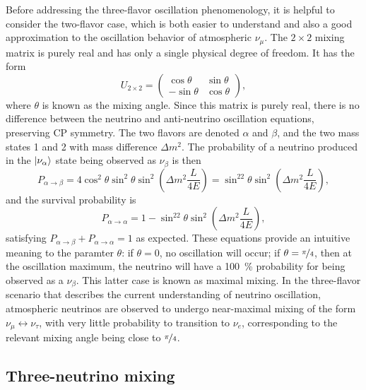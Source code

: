 Before addressing the three-flavor oscillation phenomenology,
it is helpful to consider the two-flavor case,
which is both easier to understand
and also a good approximation to the oscillation behavior
of atmospheric $\nu_\mu$.
The $2\times2$ mixing matrix is purely real
and has only a single physical degree of freedom.
It has the form
\begin{equation}\label{eq:2d_mixing}
    U_{2\times2} =
    \begin{pmatrix}
        \cos\theta & \sin\theta \\
        -\sin\theta & \cos\theta
    \end{pmatrix},
\end{equation}
where $\theta$ is known as the mixing angle.
Since this matrix is purely real,
there is no difference between the neutrino and anti-neutrino
oscillation equations, preserving CP symmetry.
The two flavors are denoted $\alpha$ and $\beta$,
and the two mass states 1 and 2 with mass difference $\Delta m^2$.
The probability of a neutrino produced in the $\ket{\nu_\alpha}$ state
being observed as $\nu_\beta$ is then
\begin{equation}\label{eq:2d_osc}
    P_{\alpha\to\beta} = 4\cos^2\theta\sin^2\theta
    \sin^2\left(\Delta m^2\frac{L}{4E}\right)
    = \sin^22\theta \sin^2\left(\Delta m^2\frac{L}{4E}\right),
\end{equation}
and the survival probability is
\begin{equation}\label{eq:2d_p_sur}
    P_{\alpha\to\alpha} = 1 -
    \sin^22\theta \sin^2\left(\Delta m^2\frac{L}{4E}\right),
\end{equation}
satisfying $P_{\alpha\to\beta} + P_{\alpha\to\alpha} = 1$ as expected.
These equations provide an intuitive meaning to the paramter $\theta$:
if $\theta = 0$, no oscillation will occur;
if $\theta = \nicefrac{\pi}{4}$,
then at the oscillation maximum, the neutrino will have a \SI{100}{\percent}
probability for being observed as a $\nu_\beta$.
This latter case is known as maximal mixing.
In the three-flavor scenario that describes the current understanding
of neutrino oscillation,
atmospheric neutrinos are observed to undergo near-maximal mixing
of the form $\nu_\mu\leftrightarrow\nu_\tau$,
with very little probability to transition to $\nu_e$,
corresponding to the relevant mixing angle being close to $\nicefrac{\pi}{4}$.

\subsection{Three-neutrino mixing}
\label{subsec:three_nu_mixing}

